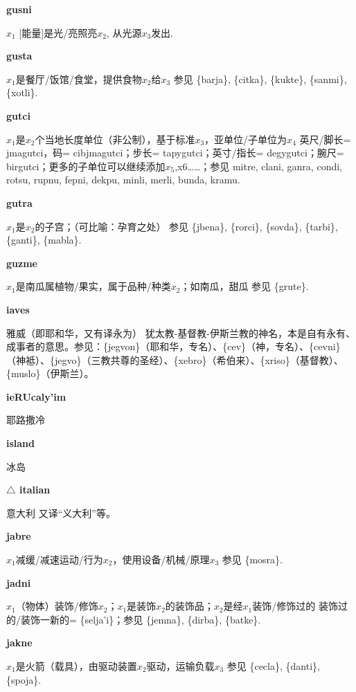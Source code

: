 \documentclass[notitlepage,twocolumn,a4paper,10pt]{book}
\begin{document}
{{\sffamily\bfseries gusni}\enspace {\ttfamily\bfseries[gus     gu'i]}  $x_1$ [能量]是光\slash{}亮照亮$x_2$, 从光源$x_3$发出.

{\sffamily\bfseries gusta} $x_1$是餐厅\slash{}饭馆\slash{}食堂，提供食物$x_2$给$x_3$ \textemdash{} 参见 \{barja\}, \{citka\}, \{kukte\}, \{sanmi\}, \{xotli\}.

{\sffamily\bfseries gutci}\enspace {\ttfamily\bfseries[guc]}  $x_1$是$x_2$个当地长度单位（非公制），基于标准$x_3$，亚单位\slash{}子单位为$x_4$ \textemdash{} 英尺\slash{}脚长= {jmagutci}，码= {cibjmagutci}；步长= {tapygutci}；英寸\slash{}指长= {degygutci}；腕尺= {birgutci}；更多的子单位可以继续添加$x_5$,x6……；参见 {mitre}, {clani}, {ganra}, {condi}, {rotsu}, {rupnu}, {fepni}, {dekpu}, {minli}, {merli}, {bunda}, {kramu}.

{\sffamily\bfseries gutra} $x_1$是$x_2$的子宫；（可比喻：孕育之处） \textemdash{} 参见 \{jbena\}, \{rorci\}, \{sovda\}, \{tarbi\}, \{ganti\}, \{mabla\}.

{\sffamily\bfseries guzme}  $x_1$是南瓜属植物\slash{}果实，属于品种\slash{}种类$x_2$；如南瓜，甜瓜 \textemdash{} 参见 \{grute\}.

{\sffamily\bfseries iaves} 雅威（即耶和华，又有译永为） \textemdash{} 犹太教-基督教-伊斯兰教的神名，本是自有永有、成事者的意思。参见：\{jegvon\}（耶和华，专名）、\{cev\}（神，专名）、\{cevni\}（神袛）、\{jegvo\}（三教共尊的圣经）、\{xebro\}（希伯来）、\{xriso\}（基督教）、\{muslo\}（伊斯兰）。

{\sffamily\bfseries ieRUcaly'im} 耶路撒冷

{\sffamily\bfseries island} 冰岛

{\sffamily\bfseries $\triangle$ italian} 意大利 \textemdash{} 又译“义大利”等。

{\sffamily\bfseries jabre} $x_1$减缓\slash{}减速运动\slash{}行为$x_2$，使用设备\slash{}机械\slash{}原理$x_3$ \textemdash{} 参见 \{mosra\}.

{\sffamily\bfseries jadni}\enspace {\ttfamily\bfseries[jad     ja'i]}  $x_1$（物体）装饰\slash{}修饰$x_2$；$x_1$是装饰$x_2$的装饰品；$x_2$是经$x_1$装饰\slash{}修饰过的 \textemdash{} 装饰过的\slash{}装饰一新的= \{selja'i\}；参见 \{jemna\}, \{dirba\}, \{batke\}.

{\sffamily\bfseries jakne} $x_1$是火箭（载具），由驱动装置$x_2$驱动，运输负载$x_3$ \textemdash{} 参见 \{cecla\}, \{danti\}, \{spoja\}.

}
\end{document}
